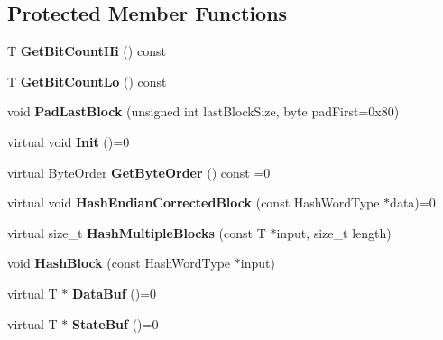 \subsection*{Protected Member Functions}
\begin{DoxyCompactItemize}
\item 
\hypertarget{class_iterated_hash_base_a33a8299a01976e215362f093589b9f6e}{
T {\bfseries GetBitCountHi} () const }
\label{class_iterated_hash_base_a33a8299a01976e215362f093589b9f6e}

\item 
\hypertarget{class_iterated_hash_base_a5fe17f6b8a18b047349b31931baa5965}{
T {\bfseries GetBitCountLo} () const }
\label{class_iterated_hash_base_a5fe17f6b8a18b047349b31931baa5965}

\item 
\hypertarget{class_iterated_hash_base_a01f39339fa69510303ad401245df1037}{
void {\bfseries PadLastBlock} (unsigned int lastBlockSize, byte padFirst=0x80)}
\label{class_iterated_hash_base_a01f39339fa69510303ad401245df1037}

\item 
\hypertarget{class_iterated_hash_base_a9f130072d067513f9d6489e19fccdf09}{
virtual void {\bfseries Init} ()=0}
\label{class_iterated_hash_base_a9f130072d067513f9d6489e19fccdf09}

\item 
\hypertarget{class_iterated_hash_base_a3a5f3b5d86cc186034dc5ff767c8e877}{
virtual ByteOrder {\bfseries GetByteOrder} () const =0}
\label{class_iterated_hash_base_a3a5f3b5d86cc186034dc5ff767c8e877}

\item 
\hypertarget{class_iterated_hash_base_a2a788752a18c19299603bc9e36440fd8}{
virtual void {\bfseries HashEndianCorrectedBlock} (const HashWordType $\ast$data)=0}
\label{class_iterated_hash_base_a2a788752a18c19299603bc9e36440fd8}

\item 
\hypertarget{class_iterated_hash_base_a05702693a33624457fba126f7768cf2a}{
virtual size\_\-t {\bfseries HashMultipleBlocks} (const T $\ast$input, size\_\-t length)}
\label{class_iterated_hash_base_a05702693a33624457fba126f7768cf2a}

\item 
\hypertarget{class_iterated_hash_base_af4f5349f8ebacfde64bb24f2ce758775}{
void {\bfseries HashBlock} (const HashWordType $\ast$input)}
\label{class_iterated_hash_base_af4f5349f8ebacfde64bb24f2ce758775}

\item 
\hypertarget{class_iterated_hash_base_a77829087074c0aea59296f06645e4eb9}{
virtual T $\ast$ {\bfseries DataBuf} ()=0}
\label{class_iterated_hash_base_a77829087074c0aea59296f06645e4eb9}

\item 
\hypertarget{class_iterated_hash_base_af809ac08c9c47bfe2e9a80b0d90dbe8e}{
virtual T $\ast$ {\bfseries StateBuf} ()=0}
\label{class_iterated_hash_base_af809ac08c9c47bfe2e9a80b0d90dbe8e}

\end{DoxyCompactItemize}


